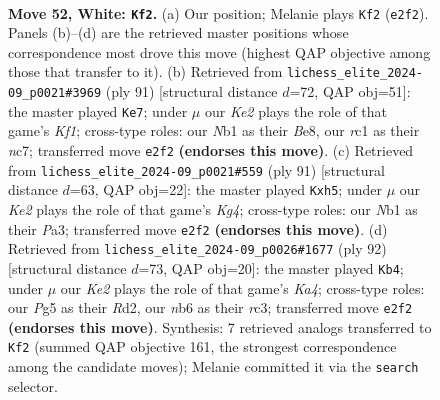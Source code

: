 \documentclass[11pt]{article}
\begin{document}
\clearpage

\begin{figure}[p]\centering
\begin{subfigure}{0.46\textwidth}\centering
\resizebox{\linewidth}{!}{%
\newchessgame
\chessboard[
  setfen={5k2/5p1p/1n4p1/p3p1P1/P3P3/1P4RP/4K1P1/RNr4r w - - 18 52},
  showmover=false,
  pgfstyle=straightmove, color=movearrow, markmove={e2-f2}
]}
\caption{}
\end{subfigure}\hfill
\begin{subfigure}{0.46\textwidth}\centering
\resizebox{\linewidth}{!}{%
\newchessgame
\chessboard[
  setfen={3Rbkr1/p1N5/1p5r/2p2p2/2P1p1p1/1PK1P3/P4P1p/3R4 b - - 1 46},
  showmover=false,
  pgfstyle=straightmove, color=movearrow, markmove={f8-e7}
]}
\caption{}
\end{subfigure}
\\[4pt]
\begin{subfigure}{0.46\textwidth}\centering
\resizebox{\linewidth}{!}{%
\newchessgame
\chessboard[
  setfen={r7/5pp1/r3p2p/3p2kP/3P4/p3P1K1/R4P2/R7 b - - 1 46},
  showmover=false,
  pgfstyle=straightmove, color=movearrow, markmove={g5-h5}
]}
\caption{}
\end{subfigure}\hfill
\begin{subfigure}{0.46\textwidth}\centering
\resizebox{\linewidth}{!}{%
\newchessgame
\chessboard[
  setfen={8/6p1/1p1k1p2/1P1Pr2p/K3P3/2r3P1/3RR1P1/8 w - - 2 47},
  showmover=false,
  pgfstyle=straightmove, color=movearrow, markmove={a4-b4}
]}
\caption{}
\end{subfigure}
\caption{\textbf{Move 52, White: \texttt{Kf2}.} (a) Our position; Melanie plays \texttt{Kf2} (\texttt{e2f2}). Panels (b)--(d) are the retrieved master positions whose correspondence most drove this move (highest QAP objective among those that transfer to it). (b) Retrieved from \texttt{lichess\_elite\_2024-09\_p0021\#3969} (ply 91) [structural distance $d$=72, QAP obj=51]: the master played \texttt{Ke7}; under $\mu$ our \emph{Ke2} plays the role of that game's \emph{Kf1}; cross-type roles: our \emph{N}b1 as their \emph{B}e8, our \emph{r}c1 as their \emph{n}c7; transferred move \texttt{e2f2} \textbf{(endorses this move)}. (c) Retrieved from \texttt{lichess\_elite\_2024-09\_p0021\#559} (ply 91) [structural distance $d$=63, QAP obj=22]: the master played \texttt{Kxh5}; under $\mu$ our \emph{Ke2} plays the role of that game's \emph{Kg4}; cross-type roles: our \emph{N}b1 as their \emph{P}a3; transferred move \texttt{e2f2} \textbf{(endorses this move)}. (d) Retrieved from \texttt{lichess\_elite\_2024-09\_p0026\#1677} (ply 92) [structural distance $d$=73, QAP obj=20]: the master played \texttt{Kb4}; under $\mu$ our \emph{Ke2} plays the role of that game's \emph{Ka4}; cross-type roles: our \emph{P}g5 as their \emph{R}d2, our \emph{n}b6 as their \emph{r}c3; transferred move \texttt{e2f2} \textbf{(endorses this move)}. Synthesis: 7 retrieved analogs transferred to \texttt{Kf2} (summed QAP objective 161, the strongest correspondence among the candidate moves); Melanie committed it via the \texttt{search} selector.}
\label{fig:thought-m102}
\end{figure}
\end{document}
